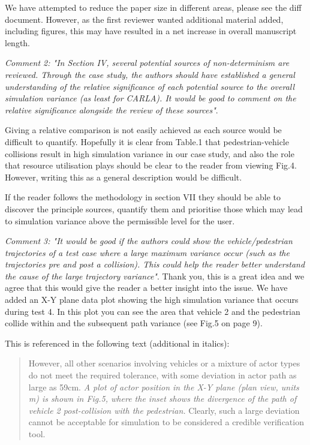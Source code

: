 \documentclass[11pt, a4paper]{letter} %
\begin{document}
\begin{letter}
We have attempted to reduce the paper size in different areas, please see the diff document. However, as the first reviewer wanted additional material added, including figures, this may have resulted in a net increase in overall manuscript length. 

\bigskip

\textit{Comment 2: "In Section IV, several potential sources of non-determinism are reviewed. Through the case study, the authors should have established a general understanding of the relative significance of each potential source to the overall simulation variance (as least for CARLA). It would be good to comment on the relative significance alongside the review of these sources"}.

Giving a relative comparison is not easily achieved as each source would be difficult to quantify. Hopefully it is clear from Table.1 that pedestrian-vehicle collisions result in high simulation variance in our case study, and also the role that resource utilisation plays should be clear to the reader from viewing Fig.4. However, writing this as a general description would be difficult. 

If the reader follows the methodology in section VII they should be able to discover the principle sources, quantify them and prioritise those which may lead to simulation variance above the permissible level for the user.

\bigskip

\textit{Comment 3: "It would be good if the authors could show the vehicle/pedestrian trajectories of a test case where a large maximum variance occur (such as the trajectories pre and post a collision). This could help the reader better understand the cause of the large trajectory variance"}.
Thank you, this is a great idea and we agree that this would give the reader a better insight into the issue. We have added an X-Y plane data plot showing the high simulation variance that occurs during test 4. In this plot you can see the area that vehicle 2 and the pedestrian collide within and the subsequent path variance (see Fig.5 on page 9). 

This is referenced in the following text (additional in italics):
\begin{quote}
However, all other scenarios involving vehicles or a mixture of actor types do not meet the required tolerance, with some deviation in actor path as large as 59cm. \textit{A plot of actor position in the X-Y plane (plan view, units m) is shown in Fig.5, where the inset shows the divergence of the path of vehicle 2 post-collision with the pedestrian.} Clearly, such a large deviation cannot be acceptable for simulation to be considered a credible verification tool.
\end{quote}


\end{letter}
\end{document}
